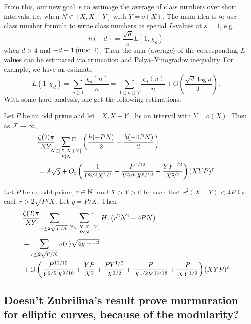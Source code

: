 From this, our new goal is to estimage the average of class numbers over short intervals, i.e. when $N \in [X, X + Y]$ with $Y = o(X)$.
The main idea is to use class number formula to write class numbers as special $L$-values at $s = 1$, e.g.
\[
h(-d) = \frac{\sqrt{d}}{\pi} L(1, \chi_d)
\]
when $d > 4$ and $-d \equiv 1 \,(\text{mod }4)$.
Then the sum (average) of the corresponding $L$-values can be estimated via truncation and Polya--Vinogradov inequality.
For example, we have an estimate
\[
L(1, \chi_d) = \sum_{n \ge 1} \frac{\chi_d(n)}{n} = \sum_{1 \le n \le T} \frac{\chi_d(n)}{n} + O\left(\frac{\sqrt{d} \log d}{T}\right).
\]
With some hard analysis, one get the following estimations.
\begin{proposition}
    Let $P$ be an odd prime and let $[X, X + Y]$ be an interval with $Y = o(X)$.
    Then as $X \to \infty$,
    \begin{align*}
        &\frac{\zeta(2) \pi}{XY} \sideset{}{{}^\square}\sum_{\substack{N \in [X, X + Y] \\ P \nmid N}}  \left(\frac{h(-PN)}{2} + \frac{h(-4PN)}{2} \right) \\
        &= A \sqrt{y} + O_{\varepsilon} \left(\frac{1}{P^{3/2}X^{1/2}} + \frac{P^{7/12}}{Y^{5/6} X^{5/12}} + \frac{YP^{1/2}}{X^{3/2}}\right) (XYP)^{\varepsilon}
    \end{align*}
\end{proposition}


\begin{proposition}
    Let $P$ be an odd prime, $r \in \mathbb{N}$, and $X > Y > 0$ be such that $r^2(X + Y) < 4 P$ for each $r > 2 \sqrt{P/X}$. Let $y = P/X$. Then
    \begin{align*}
        &\frac{\zeta(2) \pi}{ XY} \sum_{r \le 2 \sqrt{P/X}} \,\,\,\, \sideset{}{{}^\square}\sum_{\substack{N \in [X, X + Y] \\ P \nmid N}}  H_1\left(r^2 N^2 - 4 PN\right) \\
        &= \sum_{r \le 2 \sqrt{P/X}} \nu(r) \sqrt{4y - r^2} \\
        &+ O\left(\frac{P^{11/10}}{Y^{2/5}X^{9/10}} + \frac{YP}{X^2} + \frac{PY^{1/2}}{X^{3/2}} + \frac{P}{X^{1/2} Y^{13/18}} + \frac{P}{XY^{1/9}}\right) (XYP)^\varepsilon
    \end{align*}
\end{proposition}

\subsection{Doesn't Zubrilina's result prove murmuration for elliptic curves, because of the modularity?}

